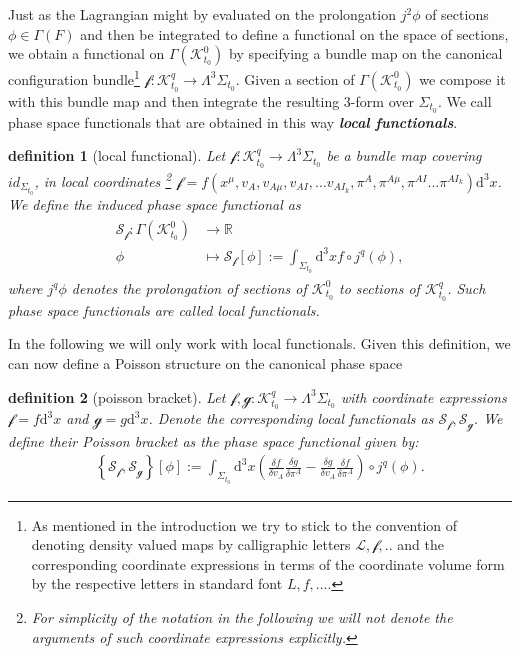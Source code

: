 \documentclass[a4paper,12pt, DIV=14, BCOR=5mm, twoside, headsepline, numbers=noenddot]{scrbook}
\newtheorem{definition}{definition}[section]
\begin{document}
Just as the Lagrangian might by evaluated on the prolongation $j^2\phi$ of sections $\phi \in \Gamma(F)$ and then be integrated to define a functional on the space of sections, we obtain a functional on $\Gamma(\mathcal{K}^0_{t_0})$ by specifying a bundle map on the canonical configuration bundle\footnote{As mentioned in the introduction we try to stick to the convention of denoting density valued maps by calligraphic letters $\mathcal{L}, \mathcal{f},..$ and the corresponding coordinate expressions in terms of the coordinate volume form by the respective letters in standard font $L,f,...$.} $\mathcal{f}: \mathcal{K}^q_{t_0} \rightarrow \Lambda^3\Sigma_{t_0}$. Given a section of $\Gamma(\mathcal{K}^0_{t_0})$ we compose it with this bundle map and then integrate the resulting 3-form over $\Sigma_{t_0}$. We call phase space functionals that are obtained in this way \textit{\textbf{local functionals}}.  
\begin{definition}[local functional]
Let $\mathcal{f}: \mathcal{K}^q_{t_0} \rightarrow \Lambda^3\Sigma_{t_0} $ be a bundle map covering $id_{\Sigma_{t_0}}$, in local coordinates \footnote{For simplicity of the notation in the following we will not denote the arguments of such coordinate expressions explicitly.} $\mathcal{f} = f(x^{\mu},v_A,v_{A\mu},v_{AI}, ... v_{AI_k},\pi^A,\pi^{A \mu}, \pi^{AI} ... \pi^{AI_k})\mathrm{d}^3x$. We define the induced phase space functional as
\begin{align}
\begin{aligned}
    \mathcal{S}_{\mathcal{f}} : \Gamma(\mathcal{K}^0_{t_0}) &\longrightarrow \mathbb{R}\\
    \phi &\longmapsto \mathcal{S}_{\mathcal{f}}[\phi] := \int_{\Sigma_{t_0}} \mathrm{d}^3x f \circ j^q(\phi),
\end{aligned}
\end{align}
where $j^q\phi$ denotes the prolongation of sections of $\mathcal{K}^0_{t_0}$ to sections of $\mathcal{K}^q_{t_0}$. Such phase space functionals are called local functionals.
\end{definition}
In the following we will only work with local functionals. 
Given this definition, we can now define a Poisson structure on the canonical phase space 
\begin{definition}[poisson bracket]
Let $\mathcal{f},\mathcal{g} : \mathcal{K}^q_{t_0} \rightarrow \Lambda^3\Sigma_{t_0} $ with coordinate expressions $\mathcal{f} = f\mathrm{d}^3x$ and $\mathcal{g} = g\mathrm{d}^3x$. Denote the corresponding local functionals as $\mathcal{S}_{\mathcal{f}}, \mathcal{S}_{\mathcal{g}}$. We define their Poisson bracket as the phase space functional given by:
\begin{align}
\left \{ \mathcal{S}_{\mathcal{f}}, \mathcal{S}_{\mathcal{g}} \right \}[\phi] := \int _{\Sigma_{t_0}} \mathrm{d}^3x \left ( \frac{\delta f}{\delta v_A} \frac{\delta g}{\delta \pi^A} - \frac{\delta g}{\delta v_A} \frac{\delta f}{\delta \pi^A}     \right ) \circ j^q(\phi)  .
\end{align}
\end{definition}
\end{document}
